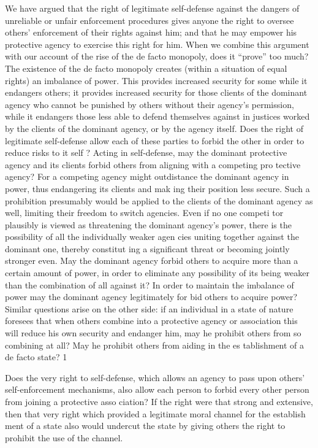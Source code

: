 \documentclass[11pt,openany]{book}
\begin{document}
We have argued that the right of legitimate self-defense against the dangers of unreliable or unfair enforcement procedures gives anyone the right to oversee others' enforcement of their rights against him; and that he may empower his protective agency to exercise this right for him. When we combine this argument with our account of the rise of the de facto monopoly, does it ``prove'' too much? The existence of the de facto monopoly creates (within a situation of equal rights) an imbalance of power. This provides increased security for some while it endangers others; it provides increased security for those clients of the dominant agency who cannot be punished by others without their agency's permission, while it endangers those less able to defend themselves against in justices worked by the clients of the dominant agency, or by the agency itself. Does the right of legitimate self-defense allow each of these parties to forbid the other in order to reduce risks to it self ? Acting in self-defense, may the dominant protective agency and its clients forbid others from aligning with a competing pro tective agency? For a competing agency might outdistance the dominant agency in power, thus endangering its clients and mak ing their position less secure. Such a prohibition presumably would be applied to the clients of the dominant agency as well, limiting their freedom to switch agencies. Even if no one competi tor plausibly is viewed as threatening the dominant agency's power, there is the possibility of all the individually weaker agen cies uniting together against the dominant one, thereby constitut ing a significant threat or becoming jointly stronger even. May the dominant agency forbid others to acquire more than a certain amount of power, in order to eliminate any possibility of its being weaker than the combination of all against it? In order to maintain the imbalance of power may the dominant agency legitimately for bid others to acquire power? Similar questions arise on the other side: if an individual in a state of nature foresees that when others combine into a protective agency or association this will reduce his own security and endanger him, may he prohibit others from so combining at all? May he prohibit others from aiding in the es tablishment of a de facto state? 1 

Does the very right to self-defense, which allows an agency to pass upon others' self-enforcement mechanisms, also allow each person to forbid every other person from joining a protective asso ciation? If the right were that strong and extensive, then that very right which provided a legitimate moral channel for the establish ment of a state also would undercut the state by giving others the right to prohibit the use of the channel. 
\end{document}
